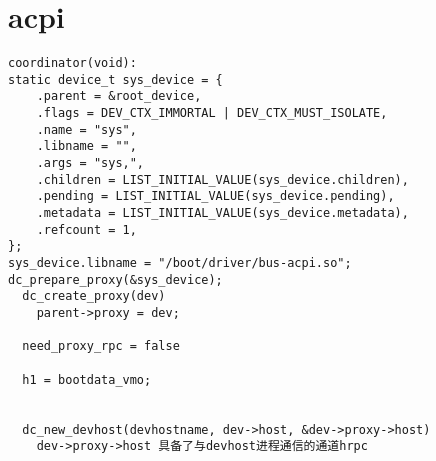 \section{acpi}

\begin{verbatim}
coordinator(void):
static device_t sys_device = {
    .parent = &root_device,
    .flags = DEV_CTX_IMMORTAL | DEV_CTX_MUST_ISOLATE,
    .name = "sys",
    .libname = "",
    .args = "sys,",
    .children = LIST_INITIAL_VALUE(sys_device.children),
    .pending = LIST_INITIAL_VALUE(sys_device.pending),
    .metadata = LIST_INITIAL_VALUE(sys_device.metadata),
    .refcount = 1,
};
sys_device.libname = "/boot/driver/bus-acpi.so";
dc_prepare_proxy(&sys_device);   
  dc_create_proxy(dev) 
    parent->proxy = dev;

  need_proxy_rpc = false

  h1 = bootdata_vmo;


  dc_new_devhost(devhostname, dev->host, &dev->proxy->host)
    dev->proxy->host 具备了与devhost进程通信的通道hrpc



\end{verbatim}